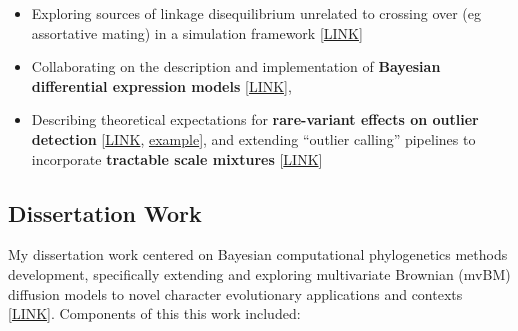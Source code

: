\documentclass[12pt]{article}
\begin{document}
\begin{itemize}[noitemsep]
\item Exploring sources of linkage disequilibrium unrelated to crossing over (eg assortative mating) in a simulation framework [\href{https://github.com/NikVetr/montgomery\_lab/blob/61e2ac4b0fea0ee7f5bf31590a40378f0027264a/assortative\_mating.R}{LINK}]

\item Collaborating on the description and implementation of \textbf{Bayesian differential expression models} \href{https://github.com/bob-carpenter/BayesExpress/blob/main/latex/bayes-express/bayes-express.tex}{[LINK]},  

\item Describing theoretical expectations for \textbf{rare-variant effects on outlier detection} [\href{https://github.com/NikVetr/montgomery_lab/blob/61e2ac4b0fea0ee7f5bf31590a40378f0027264a/prop\_outliers\_zscores\_animation.R#L4}{LINK}, \href{https://drive.google.com/file/d/1mSp22\_cqarfMDFnS55Pjg7qqmkVnk1GI}{example}], and extending ``outlier calling'' pipelines to incorporate \textbf{tractable scale mixtures} [\href{https://github.com/NikVetr/minor\_scripts/blob/master/postdoc/outlier\_mixture.R}{LINK}]

\end{itemize}

\subsection{Dissertation Work}

My dissertation work centered on Bayesian computational phylogenetics methods development, specifically extending and exploring multivariate Brownian (mvBM) diffusion models to novel character evolutionary applications and contexts [\href{https://github.com/NikVetr/papers/blob/main/dissertation/dissertation_lashinsky_2020.pdf}{LINK}]. Components of this this work included:
\end{document}
